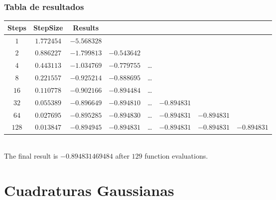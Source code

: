 \documentclass[12pt]{beamer}
\begin{document}
\begin{frame}
\frametitle{Tabla de resultados}
\fontsize{6}{6}\selectfont
\setlength\arraycolsep{2pt}
\begin{tabular}{c c c c c c c c }
 Steps	&	StepSize	&	Results	 \\ \hline							
     $1$	&	$1.772454$	&	$-5.568328$ \\ \hline 
     $2$	&	$0.886227$	&	$-1.799813$	&	$-0.543642$ \\ \hline
     $4$	&	$0.443113$	&	$-1.034769$	&	$-0.779755$	&	\ldots \\ \hline
     $8$	&	$0.221557$	&	$-0.925214$	&	$-0.888695$	&	\ldots	&	\\ \hline
    $16$	&	$0.110778$	&	$-0.902166$	&	$-0.894484$	&	\ldots	&	\\ \hline
    $32$	&	$0.055389$	&	$-0.896649$	&	$-0.894810$	&	\ldots	&	$-0.894831$ \\ \hline
    $64$	&	$0.027695$	&	$-0.895285$	&	$-0.894830$	&	\ldots	&	$-0.894831$	&	$-0.894831$ \\ \hline
   $128$	&	$0.013847$	&	$-0.894945$	&	$-0.894831$	&	\ldots	&	$-0.894831$	&	$-0.894831$	&	$-0.894831$ 
\end{tabular}
\\
\bigskip
\fontsize{12}{12}\selectfont
The final result is $-0.894831469484$ after $129$ function evaluations.
\end{frame}

\section{Cuadraturas Gaussianas}
\end{document}
